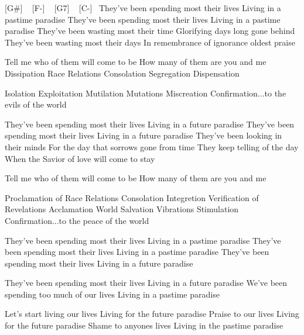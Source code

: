 [G\#] ~ [F-] ~ [G7] ~ [C-]~
They've been spending most their lives
Living in a pastime paradise
They've been spending most their lives
Living in a pastime paradise
They've been wasting most their time
Glorifying days long gone behind
They've been wasting most their days
In remembrance of ignorance oldest praise

Tell me who of them will come to be
How many of them are you and me
Dissipation
Race Relations
Consolation
Segregation
Dispensation

Isolation
Exploitation
Mutilation
Mutations
Miscreation
Confirmation...to the evils of the world

They've been spending most their lives
Living in a future paradise
They've been spending most their lives
Living in a future paradise
They've been looking in their minds
For the day that sorrows gone from time
They keep telling of the day
When the Savior of love will come to stay

Tell me who of them will come to be
How many of them are you and me

Proclamation
of Race Relations
Consolation
Integretion
Verification
of Revelations
Acclamation
World Salvation
Vibrations
Stimulation
Confirmation...to the peace of the world

They've been spending most their lives
Living in a pastime paradise
They've been spending most their lives
Living in a pastime paradise
They've been spending most their lives
Living in a future paradise

They've been spending most their lives
Living in a future paradise
We've been spending too much of our lives
Living in a pastime paradise

Let's start living our lives
Living for the future paradise
Praise to our lives
Living for the future paradise
Shame to anyones lives
Living in the pastime paradise